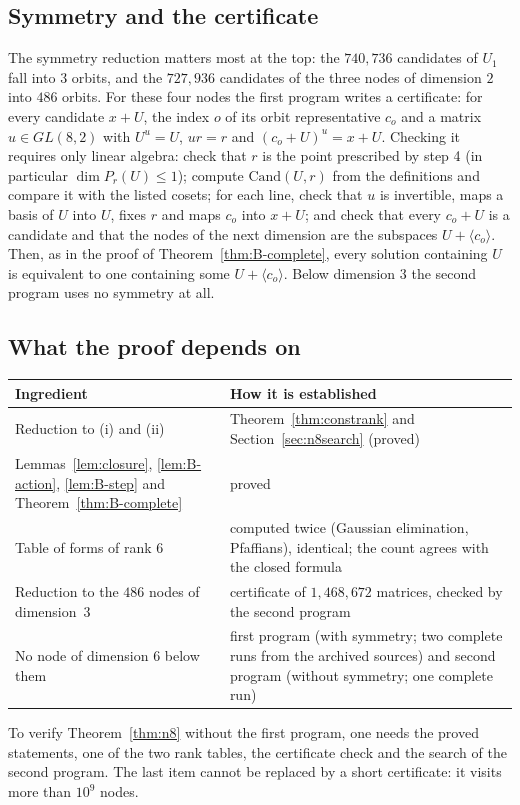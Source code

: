 \documentclass[11pt]{article}
\theoremstyle{definition}
\begin{document}
\subsection{Symmetry and the certificate}
The symmetry reduction matters most at the top: the $740{,}736$ candidates of $U_1$ fall into
$3$ orbits, and the $727{,}936$ candidates of the three nodes of dimension $2$ into $486$ orbits.
For these four nodes the first program writes a certificate: for every candidate $x+U$, the
index $o$ of its orbit representative $c_o$ and a matrix $u\in GL(8,2)$ with $U^u=U$, $ur=r$ and
$(c_o+U)^u=x+U$. Checking it requires only linear algebra: check that $r$ is the point prescribed by step 4 (in
particular $\dim P_r(U)\le1$); compute $\mathrm{Cand}(U,r)$ from the definitions and compare
it with the listed cosets; for each line, check that $u$ is invertible, maps a basis of $U$
into $U$, fixes $r$ and maps $c_o$ into $x+U$; and check that every $c_o+U$ is a candidate and
that the nodes of the next dimension are the subspaces $U+\langle c_o\rangle$. Then, as in the proof of
Theorem~\ref{thm:B-complete}, every solution containing $U$ is equivalent to one containing
some $U+\langle c_o\rangle$. Below dimension $3$ the second program uses no symmetry at all.

\subsection{What the proof depends on}\label{app:depend}
\begin{center}
\begin{tabular}{>{\raggedright\arraybackslash}p{}>{\raggedright\arraybackslash}p{}}\toprule
Ingredient & How it is established\\\midrule
Reduction to (i) and (ii) & Theorem~\ref{thm:constrank} and Section~\ref{sec:n8search} (proved)\\
Lemmas~\ref{lem:closure}, \ref{lem:B-action}, \ref{lem:B-step} and Theorem~\ref{thm:B-complete} & proved\\
Table of forms of rank $6$ & computed twice (Gaussian elimination, Pfaffians), identical; the
count agrees with the closed formula\\
Reduction to the $486$ nodes of dimension~$3$ & certificate of $1{,}468{,}672$ matrices, checked
by the second program\\
No node of dimension $6$ below them & first program (with symmetry; two complete runs
from the archived sources) and second program (without symmetry; one complete run)\\\bottomrule
\end{tabular}
\end{center}
To verify Theorem~\ref{thm:n8} without the first program, one needs the proved statements, one
of the two rank tables, the certificate check and the search of the second program. The last
item cannot be replaced by a short certificate: it visits more than $10^9$ nodes.
\end{document}
